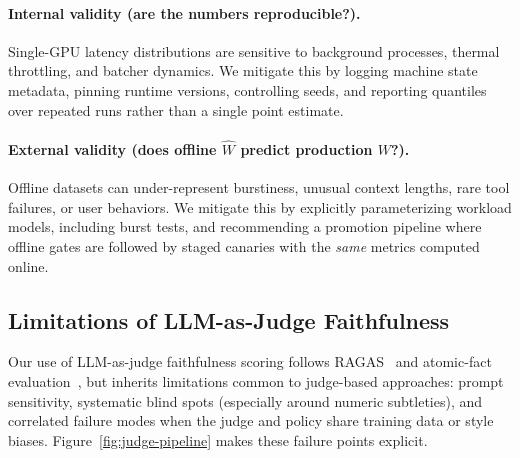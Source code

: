 \paragraph{Internal validity (are the numbers reproducible?).}
Single-GPU latency distributions are sensitive to background processes, thermal throttling, and batcher dynamics.
We mitigate this by logging machine state metadata, pinning runtime versions, controlling seeds, and reporting quantiles over repeated runs rather than a single point estimate.

\paragraph{External validity (does offline $\widehat{W}$ predict production $W$?).}
Offline datasets can under-represent burstiness, unusual context lengths, rare tool failures, or user behaviors.
We mitigate this by explicitly parameterizing workload models, including burst tests, and recommending a promotion pipeline where offline gates are followed by staged canaries with the \emph{same} metrics computed online.

\subsection{Limitations of LLM-as-Judge Faithfulness}
\label{sec:discussion-judge}

Our use of LLM-as-judge faithfulness scoring follows RAGAS~\citep{es2023ragas} and atomic-fact evaluation~\citep{atomicFacts2024}, but inherits limitations common to judge-based approaches: prompt sensitivity, systematic blind spots (especially around numeric subtleties), and correlated failure modes when the judge and policy share training data or style biases.
Figure~\ref{fig:judge-pipeline} makes these failure points explicit.

